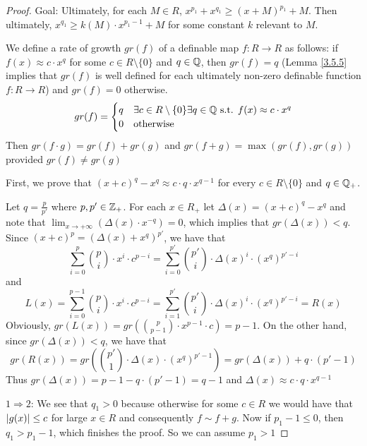 \documentclass[11pt]{article}
\begin{document}
\begin{proof}
Goal: Ultimately, for each \(M\in R\), \(x^{p_1}+x^{q_1}\ge (x+M)^{p_1}+M\). Then
ultimately, \(x^{q_1}\ge k(M)\cdot x^{p_1-1}+M\) for some constant \(k\) relevant to \(M\).

We define a rate of growth \(gr(f)\) of a definable map \(f:R\to R\) as follows:
if \(f(x)\approx c\cdot x^q\) for some \(c\in R\setminus\{0\}\) and \(q\in\mathbb{Q}\), then \(gr(f)=q\) (Lemma \ref{3.5.5} implies
that \(gr(f)\) is well defined for each ultimately non-zero definable function \(f:R\to R\))
and \(gr(f)=0\) otherwise.
\begin{equation*}
gr(f)=
\begin{cases}
q&\exists c\in R\setminus\{0\}\exists q\in\mathbb{Q}\text{ s.t. }f(x)\approx c\cdot x^q\\
0&\text{otherwise}
\end{cases}
\end{equation*}
Then \(gr(f\cdot g)=gr(f)+gr(g)\) and \(gr(f+g)=\max(gr(f),gr(g))\) provided \(gr(f)\neq gr(g)\)

First, we prove that \((x+c)^q-x^q\approx c\cdot q\cdot x^{q-1}\) for every \(c\in R\setminus\{0\}\) and \(q\in\mathbb{Q}_+\).

Let \(q=\frac{p}{p'}\) where \(p,p'\in\mathbb{Z}_+\). For each \(x\in R_+\) let \(\Delta(x)=(x+c)^q-x^q\) and note
that \(\lim_{x\to+\infty}(\Delta(x)\cdot x^{-q})=0\), which implies that \(gr(\Delta(x))<q\).
Since \((x+c)^p=(\Delta(x)+x^q)^{p'}\), we have that
\begin{equation*}
\sum_{i=0}^p\binom{p}{i}\cdot x^i\cdot c^{p-i}=\sum_{i=0}^{p'}\binom{p'}{i}\cdot\Delta(x)^i\cdot(x^q)^{p'-i}
\end{equation*}
and
\begin{equation*}
L(x)=\sum_{i=0}^{p-1}\binom{p}{i}\cdot x^i\cdot c^{p-i}=\sum_{i=1}^{p'}\binom{p'}{i}\cdot\Delta(x)^i\cdot(x^q)^{p'-i}=R(x)
\end{equation*}
Obviously, \(gr(L(x))=gr(\binom{p}{p-1}\cdot x^{p-1}\cdot c)=p-1\). On the other hand,
since \(gr(\Delta(x))<q\), we have that
\begin{equation*}
gr(R(x))=gr(\binom{p'}{1}\cdot\Delta(x)\cdot(x^q)^{p'-1})=gr(\Delta(x))+q\cdot(p'-1)
\end{equation*}
Thus \(gr(\Delta(x))=p-1-q\cdot(p'-1)=q-1\) and \(\Delta(x)\approx c\cdot q\cdot x^{q-1}\)

\(1\Rightarrow 2\): We see that \(q_1>0\) because otherwise for some \(c\in R\) we would have
that \(\abs{g(x)}\le c\) for large \(x\in R\) and consequently \(f\sim f+g\). Now if \(p_1-1\le 0\),
then \(q_1>p_1-1\), which finishes the proof. So we can assume \(p_1>1\)


\end{proof}
\end{document}
